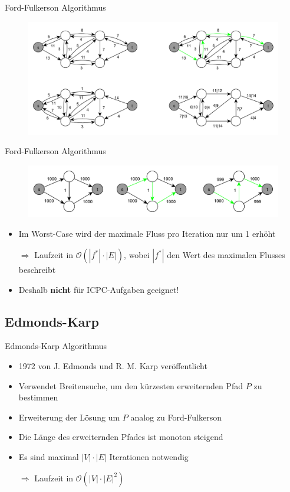 \documentclass[18pt]{beamer}
\begin{document}
\begin{frame}{Ford-Fulkerson Algorithmus}
\begin{figure}
	\includegraphics[width = \textwidth]{img/Jakob_Ford2.pdf}
\end{figure}
\end{frame}


\begin{frame}{Ford-Fulkerson Algorithmus}
\begin{figure}
\includegraphics[width = \textwidth]{img/Jakob_Ford3.pdf}
\end{figure}
\begin{itemize}
	\item Im Worst-Case wird der maximale Fluss pro Iteration nur um 1 erh\"oht
	\item[$\Rightarrow$]  Laufzeit in $\mathcal O(|f^*|\cdot |E|)$, wobei $|f^*|$ den Wert des maximalen Flusses beschreibt
	\item Deshalb \textbf{nicht} f\"ur ICPC-Aufgaben geeignet!
\end{itemize}
\end{frame}

\subsection{Edmonds-Karp}
\begin{frame}{Edmonds-Karp Algorithmus}
\begin{itemize}
\item 1972 von J. Edmonds und R. M. Karp ver\"offentlicht
\item Verwendet Breitensuche, um den k\"urzesten erweiternden Pfad $P$ zu bestimmen
\item Erweiterung der L\"osung um $P$ analog zu Ford-Fulkerson
\item Die L\"ange des erweiternden Pfades ist monoton steigend
\item Es sind maximal $|V|\cdot |E|$ Iterationen notwendig
\item[$\Rightarrow$] Laufzeit in $\mathcal O(|V| \cdot |E|^2)$
\end{itemize}
\end{frame}
\end{document}
